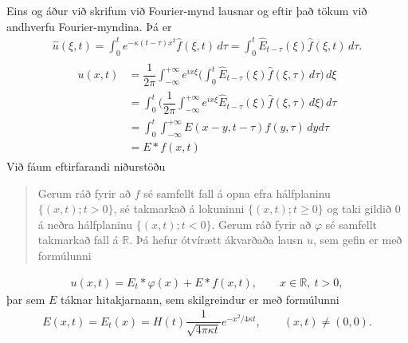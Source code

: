 \documentclass[a4paper,10pt,icelandic]{sphinxmanual}
\begin{document}
Eins og áður við skrifum við Fourier-mynd lausnar og eftir það tökum við andhverfu Fourier-myndina. Þá er
\begin{equation*}
\begin{split}\widehat u({\xi},t)=\int_0^te^{-{\kappa}(t-{\tau})x^2}\widehat
f({\xi},t)\, d{\tau} = \int_0^t\widehat E_{t-{\tau}}({\xi})\widehat
f({\xi},t)\, d{\tau}.\end{split}
\end{equation*}\begin{equation*}
\begin{split}\begin{aligned}
u(x,t)&=\dfrac 1{2{\pi}}\int_{-\infty}^{+\infty}e^{ix{\xi}}
\bigg(\int_0^t\widehat E_{t-{\tau}}({\xi})\widehat
f({\xi},{\tau})\, d{\tau} \bigg)\, d{\xi}\\
&=\int_0^t\bigg(
\dfrac 1{2{\pi}}\int_{-\infty}^{+\infty}e^{ix{\xi}}
\widehat E_{t-{\tau}}({\xi})\widehat
f({\xi},{\tau})\, d{\xi}\bigg)\, d{\tau}\\
&=\int_0^t \int_{-\infty}^{+\infty}
E(x-y,t-\tau)f(y,{\tau})\, dy d{\tau} \\
&= E\ast f(x,t) \end{aligned}\end{split}
\end{equation*}
Við fáum eftirfarandi niðurstöðu

\begin{quote}

Gerum ráð fyrir að \(f\) sé samfellt fall á opna efra hálfplaninu \(\{(x,t); t>0\}\), sé takmarkað á lokuninni \(\{(x,t); t\geq 0\}\) og taki gildið 0 á neðra hálfplaninu \(\{(x,t); t<0\}\). Gerum ráð fyrir að  \({\varphi}\) sé samfellt takmarkað fall á \({{\mathbb R}}\). Þá hefur {\hyperref[\detokenize{Kafli04:upphafvarmi2}]{}} ótvírætt ákvarðaða lausn \(u\), sem gefin er með formúlunni
\end{quote}
\begin{equation*}
\begin{split}u(x,t)=E_t\ast {\varphi}(x)+E\ast f(x,t), \qquad x\in {{\mathbb  R}},\ t>0,\end{split}
\end{equation*}
þar sem \(E\) táknar hitakjarnann, sem skilgreindur er með formúlunni
\begin{equation*}
\begin{split}E(x,t)=E_t(x)=H(t) \dfrac
1{\sqrt{4{\pi}{\kappa}t}}e^{-x^2/4{\kappa}t},
\qquad (x,t)\neq (0,0).\end{split}
\end{equation*}
\end{document}
